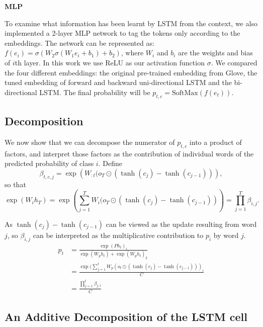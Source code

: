 \documentclass{article}
\begin{document}
\textbf{MLP}

To examine what information has been learnt by LSTM from the context, we also implemented a 2-layer MLP network to tag the tokens only according to the embeddings. The network can be represented as: $f(e_i) = \sigma(W_2 \sigma(W_1 e_i + b_1) + b_2)$, where $W_i$ and $b_i$ are the  weights and bias of $i$th layer. In this work we use ReLU as our activation function $\sigma$. We compared the four different embeddings: the original pre-trained embedding from Glove, the tuned embedding of forward and backward uni-directional LSTM and the bi-directional LSTM. The final probability will be $p_{t, c} = \text{SoftMax}(f(e_t))$.

\subsection{Decomposition}

We now show that we can decompose the numerator of $p_{t, c}$ into a product of factors, and interpret those factors as the contribution of individual words of the predicted probability of class $i$. 
Define 
\begin{equation}\label{eq:beta} 
\beta_{t,c, j} = \exp\left(W_{:t} (o_T \odot (\tanh(c_j)- \tanh(c_{j-1}))\right),
\end{equation}
so that 
\[\exp( W_ih_T) = \exp\left(\sum_{j=1}^T W_i (o_T \odot (\tanh(c_j) - \tanh(c_{j-1}))\right) = \prod_{j=1}^T \beta_{i,j}.\]

As $\tanh(c_j) - \tanh(c_{j-1})$ can be viewed as the update resulting from word $j$, so $\beta_{i,j}$ can be interpreted as the multiplicative contribution to $p_{i}$ by word $j$. 
\begin{align}
p_{t} & = \frac{\exp( Ph_t)_i}{\exp(W_ph_t) + \exp(W_ph_t)_2} \\
& = \frac{\exp(\sum_{j=1}^t W_p (o_t \odot (\tanh(c_j) - \tanh(c_{j-1})))_i}{C} \\
& = \frac{\prod_{j=1}^t \beta_{j, i}}{C}
\end{align}
\subsection{An Additive Decomposition of the LSTM cell}
\end{document}
